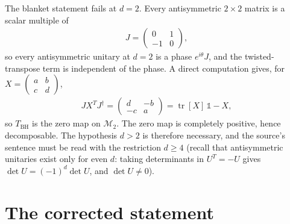 \documentclass{article}
\begin{document}
The blanket statement fails at $d=2$. Every antisymmetric $2\times2$ matrix
is a scalar multiple of
\begin{align}
  J=\begin{pmatrix} 0 & 1 \\ -1 & 0 \end{pmatrix},
\end{align}
so every antisymmetric unitary at $d=2$ is a phase $e^{i\theta}J$, and the
twisted-transpose term is independent of the phase. A direct computation
gives, for $X=(\begin{smallmatrix} a & b \\ c & d\end{smallmatrix})$,
\begin{align}
  JX^{T}J^{\dagger}
  =\begin{pmatrix} d & -b \\ -c & a\end{pmatrix}
  =\operatorname{tr}[X]\,\mathbb 1-X,
\end{align}
so $T_{\mathrm{BH}}$ is the zero map on $\mathcal M_2$. The zero map is
completely positive, hence decomposable. The hypothesis $d>2$ is therefore
necessary, and the source's sentence must be read with the restriction
$d\ge4$ (recall that antisymmetric unitaries exist only for even $d$: taking
determinants in $U^{T}=-U$ gives $\det U=(-1)^{d}\det U$, and $\det U\ne0$).

\section{The corrected statement}
\end{document}
